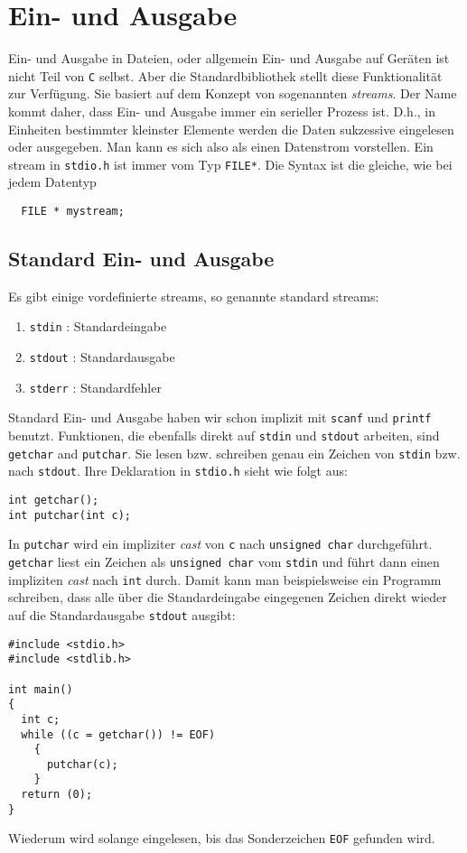 \section{Ein- und Ausgabe}

Ein- und Ausgabe in Dateien, oder allgemein Ein- und Ausgabe auf Geräten ist nicht Teil von \texttt{C} selbst.
Aber die Standardbibliothek stellt diese Funktionalität zur Verfügung.
Sie basiert auf dem Konzept von sogenannten \emph{streams}.
Der Name kommt daher, dass Ein- und Ausgabe immer ein serieller Prozess ist.
D.h., in Einheiten bestimmter kleinster Elemente werden die Daten sukzessive eingelesen oder ausgegeben.
Man kann es sich also als einen Datenstrom vorstellen.
Ein stream in \verb|stdio.h| ist immer vom Typ \verb|FILE*|.
Die Syntax ist die gleiche, wie bei jedem Datentyp
\begin{lstlisting}
  FILE * mystream;
\end{lstlisting}

\subsection{Standard Ein- und Ausgabe}

Es gibt einige vordefinierte streams, so genannte standard streams:
\begin{enumerate}
\item \verb|stdin| : Standardeingabe 
\item \texttt{stdout} : Standardausgabe 
\item \texttt{stderr} : Standardfehler 
\end{enumerate} 
Standard Ein- und Ausgabe haben wir schon implizit mit \texttt{scanf} und \texttt{printf} benutzt.
Funktionen, die ebenfalls direkt auf \verb|stdin| und \texttt{stdout} arbeiten, sind \verb|getchar| and \verb|putchar|.
Sie lesen bzw. schreiben genau ein Zeichen von \verb|stdin| bzw. nach \texttt{stdout}.
Ihre Deklaration in \verb|stdio.h| sieht wie folgt aus:
\begin{lstlisting}
int getchar();
int putchar(int c);
\end{lstlisting}
In \verb|putchar| wird ein impliziter \emph{cast} von \verb|c| nach \verb|unsigned char| durchgeführt.
\verb|getchar| liest ein Zeichen als \verb|unsigned char| vom \verb|stdin| und führt dann einen impliziten \emph{cast} nach \verb|int| durch.
Damit kann man beispielsweise ein Programm schreiben, dass alle über die Standardeingabe eingegenen Zeichen direkt wieder auf die Standardausgabe \texttt{stdout} ausgibt:
\begin{lstlisting}
#include <stdio.h>
#include <stdlib.h>

int main()
{
  int c;
  while ((c = getchar()) != EOF)
    {
      putchar(c);
    }
  return (0);
}
\end{lstlisting}
Wiederum wird solange eingelesen, bis das Sonderzeichen \verb|EOF| gefunden wird.

